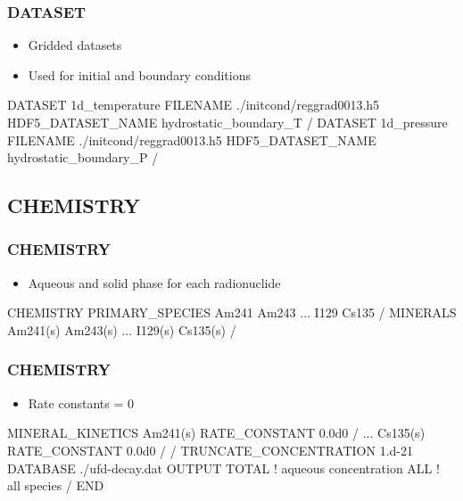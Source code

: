 \documentclass{beamer}
\newcommand\bluecomment[1]{{{\color{blue} #1}}}
\begin{document}
\begin{frame}[fragile]\frametitle{DATASET}

\begin{itemize}
  \item Gridded datasets
  \item Used for initial and boundary conditions
\end{itemize}

\begin{semiverbatim}
DATASET 1d_temperature
  FILENAME ./initcond/reggrad0013.h5
  HDF5_DATASET_NAME hydrostatic_boundary_T
/
DATASET 1d_pressure
  FILENAME ./initcond/reggrad0013.h5
  HDF5_DATASET_NAME hydrostatic_boundary_P
/
\end{semiverbatim}

\end{frame}

\subsection{CHEMISTRY}

\begin{frame}[fragile]\frametitle{CHEMISTRY}

\begin{itemize}
  \item Aqueous and solid phase for each radionuclide
\end{itemize}

\begin{semiverbatim}
CHEMISTRY
  PRIMARY_SPECIES
    Am241
    Am243
    \bluecomment{...}
    I129
    Cs135
  /
  MINERALS
    Am241(s)
    Am243(s)
    \bluecomment{...}
    I129(s)
    Cs135(s)
  /
\end{semiverbatim}

\end{frame}

\begin{frame}[fragile]\frametitle{CHEMISTRY}

\begin{itemize}
  \item Rate constants = 0
\end{itemize}

\begin{semiverbatim}\small
  MINERAL_KINETICS
    Am241(s)
      RATE_CONSTANT 0.0d0
    /
    \bluecomment{...}
    Cs135(s)
      RATE_CONSTANT 0.0d0
    /
  /
  TRUNCATE_CONCENTRATION 1.d-21
  DATABASE ./ufd-decay.dat
  OUTPUT
    TOTAL \bluecomment{! aqueous concentration}
    ALL   \bluecomment{! all species}
  /
END
\end{semiverbatim}

\end{frame}
\end{document}
